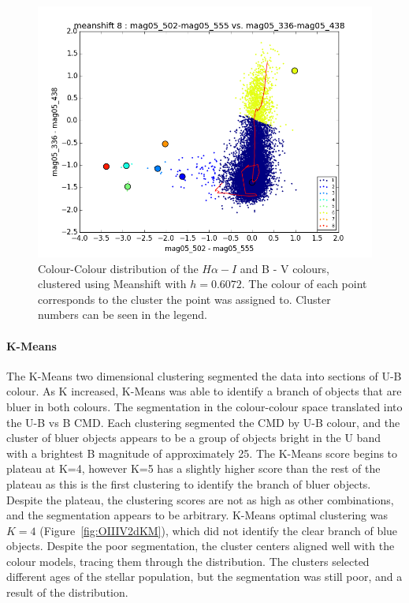 \begin{figure}
\centering
\includegraphics[width=\linewidth]{figs/unsuccessful/meanshift_color_8cl_mag05_502-mag05_555vsmag05_336-mag05_438}
\caption{Colour-Colour distribution of the $H\alpha - I$ and B - V colours, clustered using Meanshift with $h=0.6072$. The colour of each point corresponds to the cluster the point was assigned to. Cluster numbers can be seen in the legend.}
\label{fig:HAlphaI2dMS}
\end{figure}

\paragraph{K-Means}
The K-Means two dimensional clustering segmented the data into sections of U-B colour.
As K increased, K-Means was able to identify a branch of objects that are bluer in both colours.
The segmentation in the colour-colour space translated into the U-B vs B CMD. 
Each clustering segmented the CMD by U-B colour, and the cluster of bluer objects appears to be a group of objects bright in the U band with a brightest B magnitude of approximately 25.
The K-Means score begins to plateau at K=4, however K=5 has a slightly higher score than the rest of the plateau as this is the first clustering to identify the branch of bluer objects.
Despite the plateau, the clustering scores are not as high as other combinations, and the segmentation appears to be arbitrary.
K-Means optimal clustering was $K=4$ (Figure~\ref{fig:OIIIV2dKM}), which did not identify the clear branch of blue objects.
Despite the poor segmentation, the cluster centers aligned well with the colour models, tracing them through the distribution.
The clusters selected different ages of the stellar population, but the segmentation was still poor, and a result of the distribution. 

